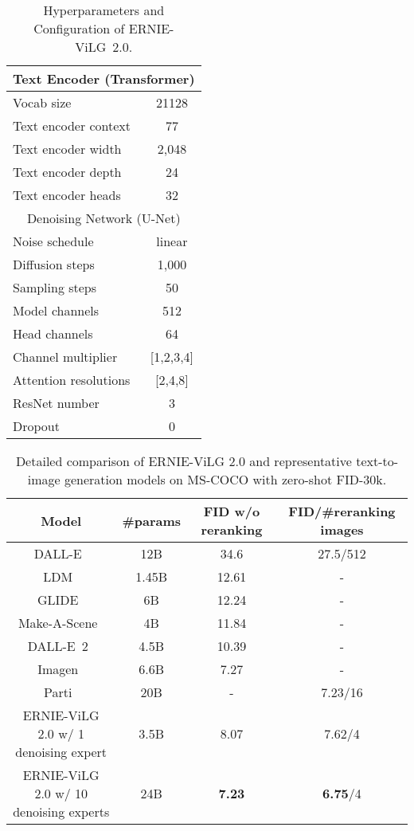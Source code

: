 \documentclass[10pt,twocolumn,letterpaper]{article}
\begin{document}
\begin{table}[t]
  \centering\small
  \caption{Hyperparameters and Configuration of ERNIE-ViLG~2.0.}
    \begin{tabular}{lc}
    \toprule
    \multicolumn{2}{c}{Text Encoder (Transformer)} \\
    \midrule
    Vocab size & 21128 \\
    Text encoder context & 77 \\
    Text encoder width & 2,048 \\
    Text encoder depth & 24 \\
    Text encoder heads & 32 \\
    \bottomrule
    \toprule
    \multicolumn{2}{c}{Denoising Network (U-Net)} \\
    \midrule
    Noise schedule & linear \\
    Diffusion steps & 1,000 \\
    Sampling steps & 50 \\
    Model channels & 512 \\
    Head channels & 64 \\
    Channel multiplier & [1,2,3,4] \\ 
    Attention resolutions & [2,4,8] \\
    ResNet number & 3 \\
    Dropout & 0 \\
    \bottomrule
    \end{tabular}\label{tab:config}\end{table}

\begin{table*}[t]
  \centering\small
  \caption{Detailed comparison of ERNIE-ViLG 2.0 and representative text-to-image generation models on MS-COCO  with zero-shot FID-30k.}
    \begin{tabular}{cccc}
    \toprule
    Model & \#params & FID w/o reranking & FID/\#reranking images \\
    \midrule
    DALL-E~\cite{DBLP:conf/icml/RameshPGGVRCS21} & 12B   & 34.6  & 27.5/512 \\
    LDM~\cite{DBLP:journals/corr/abs-2112-10752}  & 1.45B & 12.61 & - \\
    GLIDE~\cite{DBLP:conf/icml/NicholDRSMMSC22}   & 6B    & 12.24 & - \\
    Make-A-Scene~\cite{DBLP:journals/corr/abs-2203-13131} & 4B    & 11.84 & - \\
    DALL-E~2~\cite{DBLP:journals/corr/abs-2204-06125} & 4.5B  & 10.39 & - \\
    Imagen~\cite{DBLP:journals/corr/abs-2205-11487}   & 6.6B  & 7.27  & - \\
    Parti~\cite{DBLP:journals/corr/abs-2206-10789} & 20B   & -     & 7.23/16 \\
    \midrule
    ERNIE-ViLG 2.0 w/ 1 denoising expert & 3.5B  & 8.07  & 7.62/4 \\
    ERNIE-ViLG 2.0 w/ 10 denoising experts & 24B   & \textbf{7.23} &  \textbf{6.75}/4 \\
    \bottomrule
    \end{tabular}

  \label{tab:fid}\end{table*}
\end{document}
